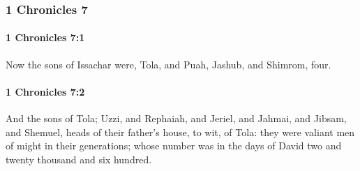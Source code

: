	\subsubsection{1 Chronicles 7} %
		\label{1CHRONICLES-7}

		\paragraph{1 Chronicles 7:1} %
			\label{1CHRONICLES-7-1}

			Now the sons of Issachar were, Tola, and Puah, Jashub, and Shimrom, four.


		\paragraph{1 Chronicles 7:2} %
			\label{1CHRONICLES-7-2}

			And the sons of Tola; Uzzi, and Rephaiah, and Jeriel, and Jahmai, and Jibsam, and Shemuel, heads of their father’s house, to wit, of Tola: they were valiant men of might in their generations; whose number was in the days of David two and twenty thousand and six hundred.

